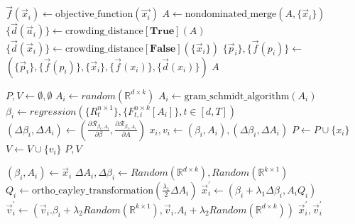 \begin{algorithm}[H]
\begin{algorithmic}[1]
\State $\vec{f}(\vec{x}_i) \gets \text{objective\_function}(\vec{x_i})$ 
\EndFor 
\State $A \gets \text{nondominated\_merge}(A, \{\vec{x}_i\})$ 
\State $\{ \vec{d}(\vec{a}_i)\} \gets\text{crowding\_distance}[\textbf{True}](A)$
\State $\{ \vec{d}(\vec{x}_i)\} \gets\text{crowding\_distance}[\textbf{False}](\{\vec{x}_i\})$
\State $\{\vec{p}_i\}, \{\vec{f}(p_i)\} \gets$ $(\{\vec{p}_i\}, \{\vec{f}(p_i)\},\{\vec{x}_i\}, \{\vec{f}(x_i)\}, \{\vec{d}(x_i)\})$
\EndFor
\State \Return $A$
\end{algorithmic}
\end{algorithm}

\begin{algorithm}[H]
\caption{$\text{initialize\_position\_and\_velocity}(N)$}
\label{mopso:initilize_position_and_velocity}
\begin{algorithmic}[1]
\State $P, V \gets \emptyset, \emptyset$
    \State $A_i \gets random(\mathbb{R}^{d\times k})$
    \State $A_i \gets \text{gram\_schmidt\_algorithm}(A_i)$
    \State $\beta_i \gets regression(\{R^{n\times 1}_{t}\},\{F^{n\times k}_{t,i}[A_i]\}, t\in [d,T])$
    \State $(\Delta \beta_i,\Delta A_i) \gets (\frac{\partial \mathcal{R}_{\beta_i, A_{i}}}{\partial \beta},\frac{\partial \mathcal{R}_{\beta_i, A_{i}}}{\partial A})$
    \State $x_i, v_i\gets (\beta_i,A_i), (\Delta \beta_i,\Delta A_i)$
    \State $P\gets P \cup \{x_i\}$
    \State $V\gets V \cup \{v_i\}$
\EndFor
\State \Return $P, V$
\end{algorithmic}
\end{algorithm}

\begin{algorithm}[H]
\caption{$\text{mutate}[\vec{\lambda}](\vec{x}_i,\vec{v}_i)$}
\label{mopso:mutate}
\begin{algorithmic}[1]
\State $(\beta_i, A_i)\gets \vec{x}_i$
\State $\Delta A_i, \Delta \beta_i \gets Random(\mathbb{R}^{d\times k}),Random(\mathbb{R}^{k\times 1})$
\State $Q_i \gets \text{ortho\_cayley\_transformation}(\frac{\lambda_1}{2} \Delta A_i)$
\State $\vec{x}^{'}_i\gets (\beta_i + \lambda_1 \Delta \beta_i, A_iQ_i)$
\State $\vec{v}^{'}_i \gets (\vec{v}_i.\beta_i + \lambda_2 Random(\mathbb{R}^{k\times 1}), \vec{v}_i.A_i + \lambda_2 Random(\mathbb{R}^{d\times k}))$
\State \Return $\vec{x}^{'}_i, \vec{v}^{'}_i$
\end{algorithmic}
\end{algorithm}

